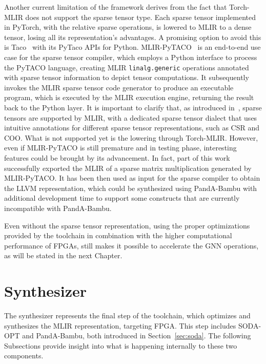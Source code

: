 Another current limitation of the framework derives from the fact that Torch-MLIR does not support the sparse tensor type.
Each sparse tensor implemented in PyTorch, with the relative sparse operations, is lowered to MLIR to a dense tensor, losing all its representation's advantages.
A promising option to avoid this is Taco~\cite{taco} with its PyTaco APIs for Python.
MLIR-PyTACO~\cite{mlir-pytaco} is an end-to-end use case for the sparse tensor compiler, which employs a Python interface to process the PyTACO language, creating MLIR \lstinline{linalg.generic} operations annotated with sparse tensor information to depict tensor computations.
It subsequently invokes the MLIR sparse tensor code generator to produce an executable program, which is executed by the MLIR execution engine, returning the result back to the Python layer.
It is important to clarify that, as introduced in~\cite{Bik_2022}, sparse tensors are supported by MLIR, with a dedicated sparse tensor dialect that uses intuitive annotations for different sparse tensor representations, such as CSR and COO.
What is not supported yet is the lowering through Torch-MLIR\@.
However, even if MLIR-PyTACO is still premature and in testing phase, interesting features could be brought by its advancement.
In fact, part of this work successfully exported the MLIR of a sparse matrix multiplication generated by MLIR-PyTACO\@.
It has been then used as input for the sparse compiler to obtain the LLVM representation, which could be synthesized using PandA-Bambu with additional development time to support some constructs that are currently incompatible with PandA-Bambu.

Even without the sparse tensor representation, using the proper optimizations provided by the toolchain in combination with the higher computational performance of FPGAs, still makes it possible to accelerate the GNN operations, as will be stated in the next Chapter.

\section{Synthesizer}
\label{sec:toolchain-synthesizer}%

The synthesizer represents the final step of the toolchain, which optimizes and synthesizes the MLIR representation, targeting FPGA\@.
This step includes SODA-OPT and PandA-Bambu, both introduced in Section~\ref{sec:soda}.
The following Subsections provide insight into what is happening internally to these two components.

